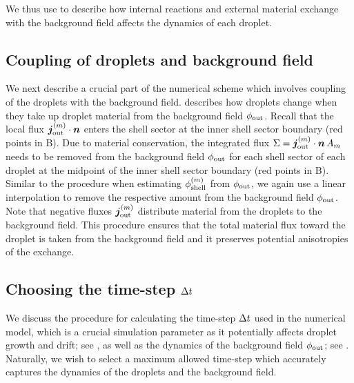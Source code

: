 We thus use  to describe how internal reactions and external material exchange with the background field affects the dynamics of each droplet.

\subsection{Coupling of droplets and background field}

We next describe a crucial part of the numerical scheme which involves coupling of the droplets with the background field. 
 describes how droplets change when they take up droplet material from the background field $\phi_\mathrm{out}$.
Recall that the local flux $\boldsymbol{j}_\mathrm{out}^{(m)} \cdot \boldsymbol{n}$ enters the shell sector at the inner shell sector boundary (red points in B).
Due to material conservation, the integrated flux $\Sigma = \boldsymbol{j}_\mathrm{out}^{(m)} \cdot \boldsymbol{n}\,A_m$ needs to be removed from the background field $\phi_\mathrm{out}$ for each shell sector of each droplet at the midpoint of the inner shell sector boundary (red points in B).
Similar to the procedure when estimating $\phi_\mathrm{shell}^{(m)}$ from $\phi_\mathrm{out}$, we again use a linear interpolation to remove the respective amount from the background field $\phi_\mathrm{out}$.
Note that negative fluxes $\boldsymbol{j}_\mathrm{out}^{(m)}$ distribute material from the droplets to the background field.
This procedure ensures that the total material flux toward the droplet is taken from the background field and it preserves potential anisotropies of the exchange.

\subsection{Choosing the time-step $\Delta t$}

We discuss the procedure for calculating the time-step $\Delta t$ used in the numerical model, which is a crucial simulation parameter as it potentially affects droplet growth and drift; see , as well as the dynamics of the background field $\phi_\mathrm{out}$; see .
Naturally, we wish to select a maximum allowed time-step which accurately captures the dynamics of the droplets and the background field. 

